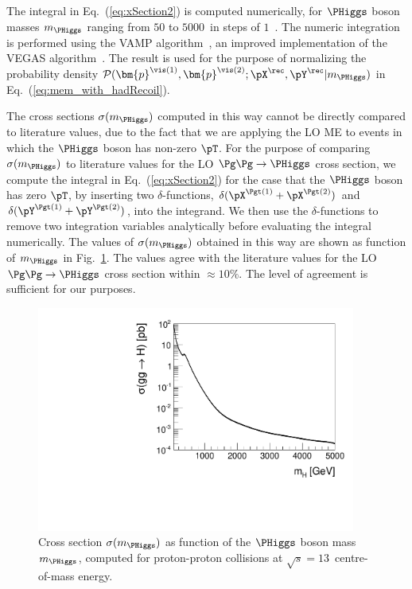 The integral in Eq.~(\ref{eq:xSection2}) is computed numerically,
for $\PHiggs$ boson masses $m_{\PHiggs}$ ranging from $50$ to $5000$~\GeV in steps of $1$~\GeV.
The numeric integration is performed using the VAMP algorithm~\cite{VAMP},
an improved implementation of the VEGAS algorithm~\cite{VEGAS}.
The result is used for the purpose of normalizing the probability density $\mathcal{P}(\bm{p}^{\vis(1)},\bm{p}^{\vis(2)};\pX^{\rec},\pY^{\rec}|m_{\PHiggs})$
in Eq.~(\ref{eq:mem_with_hadRecoil}).

The cross sections $\sigma(m_{\PHiggs})$ computed in this way cannot 
be directly compared to literature values,
due to the fact that we are applying the LO ME to events in which the $\PHiggs$ boson has non-zero $\pT$.
For the purpose of comparing $\sigma(m_{\PHiggs})$ to literature
values for the LO $\Pg\Pg \to \PHiggs$ cross section,
we compute the integral in Eq.~(\ref{eq:xSection2}) for the case that the $\PHiggs$ boson has zero $\pT$,
by inserting two $\delta$-functions, $\delta(\pX^{\Pgt(1)} + \pX^{\Pgt(2)})$ and $\delta(\pY^{\Pgt(1)} + \pY^{\Pgt(2)})$, into the integrand.
We then use the $\delta$-functions to remove two integration variables
analytically before evaluating the integral numerically.
The values of $\sigma(m_{\PHiggs})$ obtained in this way are shown as function of
$m_{\PHiggs}$ in Fig.~\ref{fig:xSection}.
The values agree with the literature values for the LO $\Pg\Pg \to
\PHiggs$ cross section within $\approx 10\%$. 
The level of agreement is sufficient for our purposes.

\begin{figure}
\begin{center}
\includegraphics*[height=74mm]{plots/makeSVfitMEM_xSectionPlot_log.pdf}
\end{center}
\caption{
  Cross section $\sigma(m_{\PHiggs})$ as function of the $\PHiggs$ boson mass $m_{\PHiggs}$,
  computed for proton-proton collisions at $\sqrt{s} = 13$~\TeV centre-of-mass energy.
}
\label{fig:xSection}
\end{figure}

